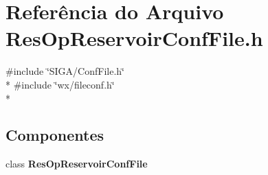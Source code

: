 \section{Referência do Arquivo Res\+Op\+Reservoir\+Conf\+File.\+h}
\label{_res_op_reservoir_conf_file_8h}
{\ttfamily \#include \char`\"{}S\+I\+G\+A/\+Conf\+File.\+h\char`\"{}}\\*
{\ttfamily \#include \char`\"{}wx/fileconf.\+h\char`\"{}}\\*
\subsection*{Componentes}
\begin{DoxyCompactItemize}
\item 
class {\bf Res\+Op\+Reservoir\+Conf\+File}
\end{DoxyCompactItemize}
